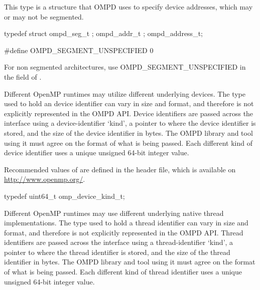 This type is a structure that OMPD uses to specify device addresses, 
which may or may not be segmented.

\format

\begin{ccppspecific}
\begin{ompEnv}
typedef struct {
  ompd_seg_t ;
  ompd_addr_t ;
} ompd_address_t;

#define OMPD_SEGMENT_UNSPECIFIED 0
\end{ompEnv}
\end{ccppspecific}


For non segmented architectures, use OMPD\_SEGMENT\_UNSPECIFIED in the  
field of .


Different OpenMP runtimes may utilize different underlying devices.
The type used to hold an device identifier can vary in size and format, and 
therefore is not explicitly represented in the OMPD API. Device identifiers are 
passed across the interface using a device-identifier `kind', a pointer to where
the device identifier is stored, and the size of the device identifier in bytes.
The OMPD library and tool using it must agree on the format
of what is being passed.
Each different kind of device identifier uses a unique
unsigned 64-bit integer value.

Recommended values of  are defined in the  
header file, which is available on \url{http://www.openmp.org/}. 

\label{ompd:omp_device_kind_t}
\format

	\begin{ccppspecific}
	\begin{ompSyntax}
typedef uint64_t omp_device_kind_t;
	\end{ompSyntax}
	\end{ccppspecific}



Different OpenMP runtimes may use different underlying native
thread implementations.
The type used to hold a thread identifier can vary in size and format, and 
therefore is not explicitly represented in the OMPD API. Thread identifiers are 
passed across the interface using a thread-identifier `kind', a pointer to where
the thread identifier is stored, and the size of the thread identifier in bytes.
The OMPD library and tool using it must agree on the format
of what is being passed.
Each different kind of thread identifier uses a unique
unsigned 64-bit integer value.

